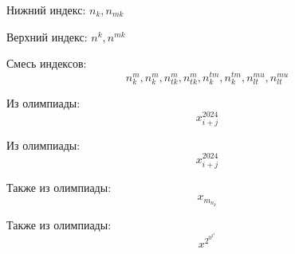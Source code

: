 \documentclass[a4paper, 12pt]{article}
\begin{document}
    Нижний индекс: $n_k, n_{mk}$

    Верхний индекс: $n^k, n^{mk}$

    Смесь индексов:
    \[n_k^m, n^m_k, n_{tk}^m, n^m_{tk}, n_k^{tm}, n^{tm}_k, n_{lt}^{mu}, n^{mu}_{lt}\]

    Из олимпиады:
    \[x_{i+j}^2024\] %

    Из олимпиады:
    \[x_{i+j}^{2024}\]

    Также из олимпиады:
    \[x_{m_{n_k}}\]

    Также из олимпиады:
    \[x^{2^{0^{2^4}}}\]
\end{document}
